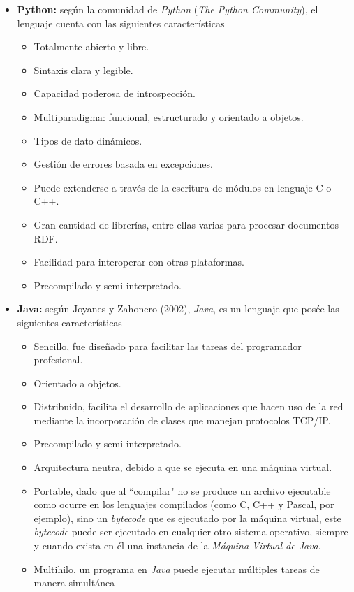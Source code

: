 \begin{itemize}
\item \textbf{Python:} según la comunidad de \textit{Python} (\textit{The Python Community}), el lenguaje cuenta con las siguientes características
    \begin{itemize}
    \item Totalmente abierto y libre.
    \item Sintaxis clara y legible.
    \item Capacidad poderosa de introspección.
    \item Multiparadigma: funcional, estructurado y orientado a objetos.
    \item Tipos de dato dinámicos.
    \item Gestión de errores basada en excepciones.
    \item Puede extenderse a través de la escritura de módulos en lenguaje C o C++.
    \item Gran cantidad de librerías, entre ellas varias para procesar documentos RDF.
    \item Facilidad para interoperar con otras plataformas.
    \item Precompilado y semi-interpretado.
    \end{itemize}
\item \textbf{Java:} según Joyanes y Zahonero (2002), \textit{Java}, es un lenguaje que posée las siguientes características
    \begin{itemize}
    \item Sencillo, fue diseñado para facilitar las tareas del programador profesional.
    \item Orientado a objetos.
    \item Distribuido, facilita el desarrollo de aplicaciones que hacen uso de la red mediante la incorporación de clases que manejan protocolos TCP/IP.
    \item Precompilado y semi-interpretado.
    \item Arquitectura neutra, debido a que se ejecuta en una máquina virtual.
    \item Portable, dado que al ``compilar" no se produce un archivo ejecutable como ocurre en los lenguajes compilados (como C, C++ y Pascal, por ejemplo), sino un \textit{bytecode} que es ejecutado por la máquina virtual, este \textit{bytecode} puede ser ejecutado en cualquier otro sistema operativo, siempre y cuando exista en él una instancia de la \textit{Máquina Virtual de Java}.
    \item Multihilo, un programa en \textit{Java} puede ejecutar múltiples tareas de manera simultánea
    \end{itemize}
\end{itemize}

